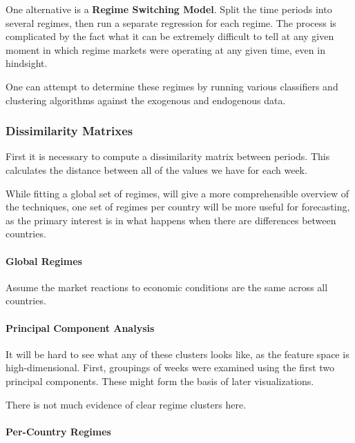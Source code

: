 \documentclass[]{article}
\let\oldparagraph\paragraph
\renewcommand{\paragraph}[1]{\oldparagraph{#1}\mbox{}}
\begin{document}
One alternative is a \textbf{Regime Switching Model}. Split the time
periods into several regimes, then run a separate regression for each
regime. The process is complicated by the fact what it can be extremely
difficult to tell at any given moment in which regime markets were
operating at any given time, even in hindsight.

One can attempt to determine these regimes by running various
classifiers and clustering algorithms against the exogenous and
endogenous data.

\subsubsection{Dissimilarity Matrixes}\label{dissimilarity-matrixes}

First it is necessary to compute a dissimilarity matrix between periods.
This calculates the distance between all of the values we have for each
week.

While fitting a global set of regimes, will give a more comprehensible
overview of the techniques, one set of regimes per country will be more
useful for forecasting, as the primary interest is in what happens when
there are differences between countries.

\paragraph{Global Regimes}\label{global-regimes}

Assume the market reactions to economic conditions are the same across
all countries.

\paragraph{Principal Component
Analysis}\label{principal-component-analysis}

It will be hard to see what any of these clusters looks like, as the
feature space is high-dimensional. First, groupings of weeks were
examined using the first two principal components. These might form the
basis of later visualizations.

There is not much evidence of clear regime clusters here.

\paragraph{Per-Country Regimes}\label{per-country-regimes}
\end{document}

